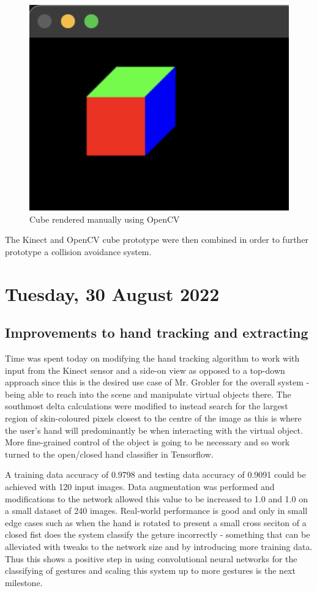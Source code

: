 \begin{figure}[h]
    \centering
    \includegraphics[width=0.7\linewidth]{figures/OpenCV_cube_rendering.png}
    \caption{Cube rendered manually using OpenCV}
    \label{fig:OpenCV_cube_rendering}
\end{figure}

The Kinect and OpenCV cube prototype were then combined in order to further prototype a collision avoidance system.

\section[2022/08/30]{Tuesday, 30 August 2022}

\subsection{Improvements to hand tracking and extracting}

Time was spent today on modifying the hand tracking algorithm to work with input from the Kinect sensor and a side-on view as opposed to a top-down approach since this is the desired use case of Mr. Grobler for the overall system - being able to reach into the scene and manipulate virtual objects there. The southmost delta calculations were modified to instead search for the largest region of skin-coloured pixels closest to the centre of the image as this is where the user's hand will predominantly be when interacting with the virtual object. More fine-grained control of the object is going to be necessary and so work turned to the open/closed hand classifier in Tensorflow.

A training data accuracy of 0.9798 and testing data accuracy of 0.9091 could be achieved with 120 input images. Data augmentation was performed and modifications to the network allowed this value to be increased to 1.0 and 1.0 on a small dataset of 240 images. Real-world performance is good and only in small edge cases such as when the hand is rotated to present a small cross seciton of a closed fist does the system classify the geture incorrectly - something that can be alleviated with tweaks to the network size and by introducing more training data. Thus this shows a positive step in using convolutional neural networks for the classifying of gestures and scaling this system up to more gestures is the next milestone. \\

